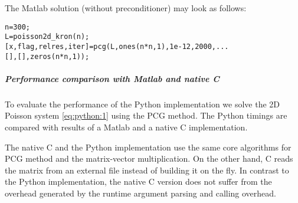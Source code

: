 \documentclass[a4paper]{article}
\newlength{\pyindent} \newlength{\pyminipagewidth}
\newenvironment{pycode}{\begin{trivlist}\item\hspace*{\pyindent}\begin{minipage}{\pyminipagewidth}\small\begin{alltt}}
      {\end{alltt}\end{minipage}\end{trivlist}}
\begin{document}
\noindent The Matlab solution (without preconditioner) may look as follows:
\begin{pycode}
n = 300;
L = poisson2d_kron(n);
[x,flag,relres,iter] = pcg(L, ones(n*n,1), 1e-12, 2000, ...
                           [], [], zeros(n*n,1));
\end{pycode}

\subparagraph{Performance comparison with Matlab and native C}
%
To evaluate the performance of the Python implementation we solve the
2D Poisson system \eqref{eq:python:1} using the PCG method. The Python
timings are compared with results of a Matlab and a native C
implementation.

The native C and the Python implementation use the same core
algorithms for PCG method and the matrix-vector multiplication. On the
other hand, C reads the matrix from an external file instead of
building it on the fly. In contrast to the Python implementation, the
native C version does not suffer from the overhead generated by the
runtime argument parsing and calling overhead.
\end{document}
